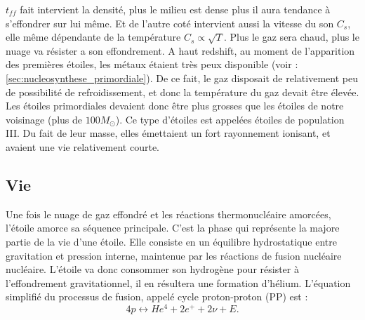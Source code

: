$t_{ff}$ fait intervient la densité, plus le milieu est dense plus il aura tendance à s'effondrer sur lui même.
Et de l'autre coté intervient aussi la vitesse du son $C_s$, elle même dépendante de la température $C_s \propto \sqrt{T}$.
Plus le gaz sera chaud, plus le nuage va résister a son effondrement.
A haut redshift, au moment de l'apparition des premières étoiles, les métaux étaient très peux disponible (voir :\ref{sec:nucleosynthese_primordiale}).
De ce fait, le gaz disposait de relativement peu de possibilité de refroidissement, et donc la température du gaz devait être élevée.
Les étoiles primordiales devaient donc être plus grosses que les étoiles de notre voisinage (plus de $100M_\odot$).
Ce type d'étoiles est appelées étoiles de population III.
Du fait de leur masse, elles émettaient un fort rayonnement ionisant, et avaient une vie relativement courte.

%

\subsection{Vie}


Une fois le nuage de gaz effondré et les réactions thermonucléaire amorcées, l'étoile amorce sa séquence principale.
C'est la phase qui représente la majore partie de la vie d'une étoile.
Elle consiste en un équilibre hydrostatique entre gravitation et pression interne, maintenue par les réactions de fusion nucléaire nucléaire.
L'étoile va donc consommer son hydrogène pour résister à l'effondrement gravitationnel, il en résultera une formation d'hélium.
L'équation simplifié du processus de fusion, appelé cycle proton-proton (PP) est :
\begin{equation}
4p \leftrightarrow He^4 + 2e^+ + 2\nu + E.
\end{equation}

